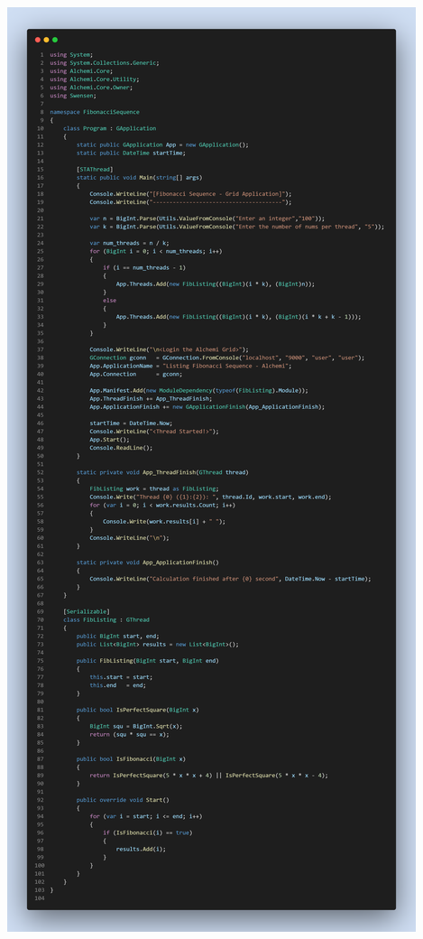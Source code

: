 \documentclass[12pt,a4paper]{report}
\begin{document}
\begin{center}
\clearpage
\includegraphics[trim=0in 0in 0in 24.3in, clip, scale=.23]{./Figures/FibonacciSequence/FibonacciSequence}
\clearpage
\end{center}
\end{document}
